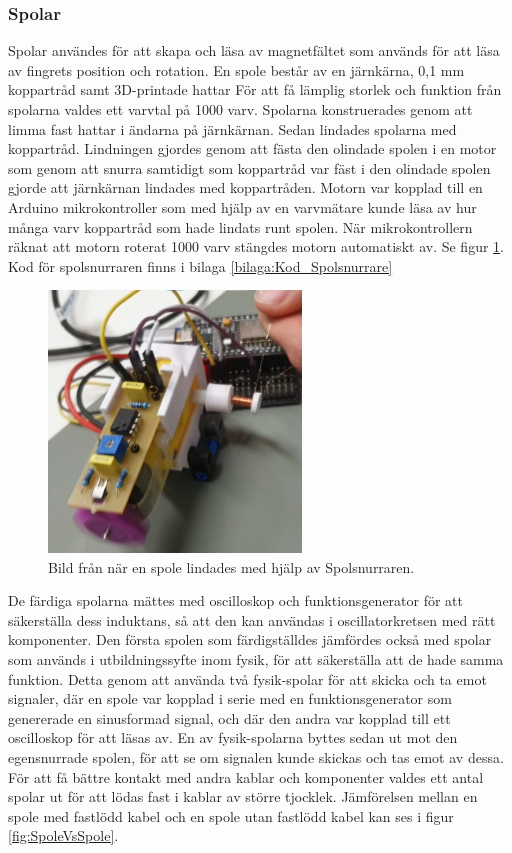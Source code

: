 \documentclass[a4paper]{article}
\begin{document}
\begin{sloppypar}
    \subsubsection{Spolar}
    Spolar användes för att skapa och läsa av magnetfältet som används för att läsa av fingrets position och rotation.
    En spole består av en järnkärna, 0,1 mm koppartråd samt 3D-printade hattar
    För att få lämplig storlek och funktion från spolarna valdes ett varvtal på 1000 varv.
    Spolarna konstruerades genom att limma fast hattar i ändarna på järnkärnan.
    Sedan lindades spolarna med koppartråd.
    Lindningen gjordes genom att fästa den olindade spolen i en motor som genom att snurra samtidigt som koppartråd
    var fäst i den olindade spolen gjorde att järnkärnan lindades med koppartråden.
    Motorn var kopplad till en Arduino mikrokontroller som med hjälp av en varvmätare kunde läsa av hur många varv
    koppartråd som hade lindats runt spolen.
    När mikrokontrollern räknat att motorn roterat 1000 varv stängdes motorn automatiskt av. Se figur \ref{fig:Spolsnurrare}.
    Kod för spolsnurraren finns i bilaga \ref{bilaga:Kod_Spolsnurrare}
    \begin{figure}[H]
        \centering
        \includegraphics[width=0.6\textwidth]{spolsnurrare1.png}
        \caption{Bild från när en spole lindades med hjälp av Spolsnurraren.}
        \label{fig:Spolsnurrare}
    \end{figure}
    \noindent
    De färdiga spolarna mättes med oscilloskop och funktionsgenerator för att säkerställa dess induktans, så att den kan användas i oscillatorkretsen med rätt komponenter.
    Den första spolen som färdigställdes jämfördes också med spolar som används i utbildningssyfte inom fysik, för att säkerställa att de hade samma funktion.
    Detta genom att använda två fysik-spolar för att skicka och ta emot signaler, där en spole var kopplad i serie med en funktionsgenerator som genererade en sinusformad signal, och där den andra var kopplad till ett oscilloskop för att läsas av.
    En av fysik-spolarna byttes sedan ut mot den egensnurrade spolen, för att se om signalen kunde skickas och tas emot av dessa.
    För att få bättre kontakt med andra kablar och komponenter valdes ett antal spolar ut för att lödas fast i kablar av större tjocklek.
    Jämförelsen mellan en spole med fastlödd kabel och en spole utan fastlödd kabel kan ses i figur \ref{fig:SpoleVsSpole}.


\end{sloppypar}
\end{document}
